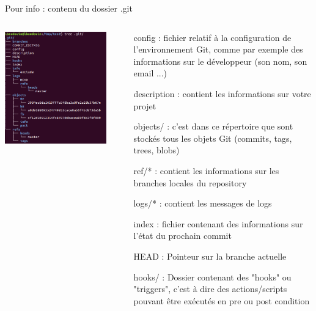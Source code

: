 \documentclass{beamer}
\begin{document}
\begin{frame}[fragile]{Pour info : contenu du dossier .git}
  \begin{columns}
    \begin{column}{0.5\linewidth}
      \includegraphics[width=0.95\linewidth]{images/tree}
    \end{column}
    \begin{column}{0.5\linewidth}
      \begin{scriptsize}
        \begin{itemize}
        \item[config] : fichier relatif à la configuration de l'environnement Git, comme par exemple des informations sur le développeur (son nom, son email ...)
        \item[description] : contient les informations sur votre projet
        \item[objects/] : c'est dans ce répertoire que sont stockés tous les objets Git (commits, tags, trees, blobs)
        \item[ref/*] : contient les informations sur les branches locales du repository
        \item[logs/*] : contient les messages de logs
        \item[index] : fichier contenant des informations sur l'état du prochain commit
        \item[HEAD] : Pointeur sur la branche actuelle
        \item[hooks/] : Dossier contenant des "hooks" ou "triggers", c'est à dire des actions/scripts pouvant être exécutés en pre ou post condition
        \end{itemize}
      \end{scriptsize}
    \end{column}
  \end{columns}
\end{frame}
\end{document}
